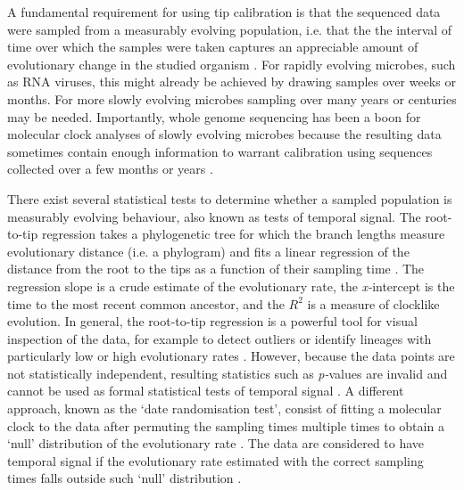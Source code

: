 \documentclass[10pt,letterpaper]{article}
\begin{document}
A fundamental requirement for using tip calibration is that the sequenced data were sampled from a measurably evolving population, i.e. that the the interval of time over which the samples were taken captures an appreciable amount of evolutionary change in the studied organism \cite{drummond2003measurably}. For rapidly evolving microbes, such as RNA viruses, this might already be achieved by drawing samples over weeks or months. For more slowly evolving microbes sampling over many years or centuries may be needed. Importantly, whole genome sequencing has been a boon for molecular clock analyses of slowly evolving microbes because the resulting data sometimes contain enough information to warrant calibration using sequences collected over a few months or years \cite{biek2015measurably}.

There exist several statistical tests to determine whether a sampled population is measurably evolving behaviour, also known as tests of temporal signal. The root-to-tip regression takes a phylogenetic tree for which the branch lengths measure evolutionary distance (i.e. a phylogram) and fits a linear regression of the distance from the root to the tips as a function of their sampling time \cite{korber2000timing}. The regression slope is a crude estimate of the evolutionary rate, the \textit{x-}intercept is the time to the most recent common ancestor, and the $R^2$ is a measure of clocklike evolution. In general, the root-to-tip regression is a powerful tool for visual inspection of the data, for example to detect outliers or identify lineages with particularly low or high evolutionary rates \cite{rambaut2016exploring,featherstone2023clockor2,volz2017scalable, doizy2023phylostems}. However, because the data points are not statistically independent, resulting statistics such as \textit{p-}values are invalid and cannot be used as formal statistical tests of temporal signal \cite{rieux2016inferences}. A different approach, known as the `date randomisation test', consist of fitting a molecular clock to the data after permuting the sampling times multiple times to obtain a `null' distribution of the evolutionary rate \cite{ramsden2009hantavirus}. The data are considered to have temporal signal if the evolutionary rate estimated with the correct sampling times falls outside such `null' distribution \cite{ramsden2009hantavirus,duchene2015performance, murray2016effect}.
\end{document}
